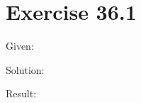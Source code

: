 \documentclass[a4paper, 10pt]{scrartcl}
\begin{document}
\section{Exercise 36.1}

Given:

Solution:

Result:
\end{document}
